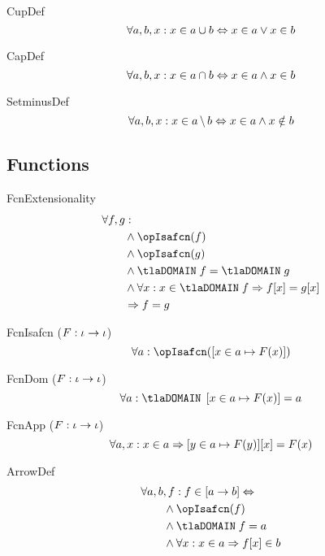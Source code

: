 \documentclass[11pt, a4paper, oneside]{article}
\begin{document}
\begin{axioms}
\item[CupDef] \[
        \forall a, b, x : x \in a \cup b \Leftrightarrow x \in a \vee x \in b
    \]

\item[CapDef] \[
        \forall a, b, x : x \in a \cap b \Leftrightarrow x \in a \wedge x \in b
    \]

\item[SetminusDef] \[
        \forall a, b, x : x \in a \,\backslash\, b \Leftrightarrow x \in a \wedge x \notin b
    \]

\end{axioms}


    \subsection{Functions}
    \label{subsec:functions}

\begin{axioms}
\item[FcnExtensionality] \[
        \begin{aligned}
            &\forall f, g : \\
            &\qquad \wedge \opIsafcn(f) \\
            &\qquad \wedge \opIsafcn(g) \\
            &\qquad \wedge \tlaDOMAIN\; f = \tlaDOMAIN\; g \\
            &\qquad \wedge \forall x : x \in \tlaDOMAIN\; f \imp f\!\bx{x} = g\!\bx{x} \\
            &\qquad \imp f = g
        \end{aligned}
    \]

\item[FcnIsafcn ($F : \iota \rightarrow \iota$)] \[
        \forall a : \opIsafcn(\bx{ x \in a \mapsto F(x) })
    \]

\item[FcnDom ($F : \iota \rightarrow \iota$)] \[
        \forall a : \tlaDOMAIN\; \bx{ x \in a \mapsto F(x) } = a
    \]

\item[FcnApp ($F : \iota \rightarrow \iota$)] \[
        \forall a, x : x \in a \Rightarrow \left[  y \in a \mapsto F(y)  \right]\!\left[ x \right] = F(x)
    \]

\item[ArrowDef] \[
        \begin{aligned}
            &\forall a, b, f : f \in \bx{ a \arr b } \eqv \\
            &\qquad \wedge \opIsafcn(f) \\
            &\qquad \wedge \tlaDOMAIN\; f = a \\
            &\qquad \wedge \forall x : x \in a \imp f\!\bx{x} \in b
        \end{aligned}
    \]

\end{axioms}
\end{document}
